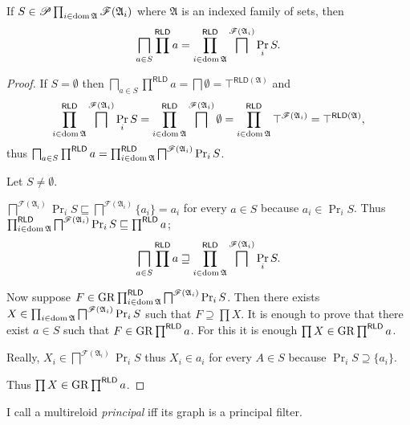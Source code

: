 \begin{thm}
If $S\in\mathscr{P}\prod_{i\in\operatorname{dom}\mathfrak{A}}\mathscr{F}(\mathfrak{A}_{i})$
where $\mathfrak{A}$ is an indexed family of sets, then 
\[
\bigsqcap_{a\in S}\prod^{\mathsf{RLD}}a=\prod_{i\in\operatorname{dom}\mathfrak{A}}^{\mathsf{RLD}}\bigsqcap^{\mathscr{F}(\mathfrak{A}_{i})}\Pr_{i}S.
\]
\end{thm}
\begin{proof}
If $S=\emptyset$ then $\bigsqcap_{a\in S}\prod^{\mathsf{RLD}}a=\bigsqcap\emptyset=\top^{\mathsf{RLD}(\mathfrak{A})}$
and 
\[
\prod_{i\in\operatorname{dom}\mathfrak{A}}^{\mathsf{RLD}}\bigsqcap^{\mathscr{F}(\mathfrak{A}_{i})}\Pr_{i}S=
\prod_{i\in\operatorname{dom}\mathfrak{A}}^{\mathsf{RLD}}\bigsqcap^{\mathscr{F}(\mathfrak{A}_{i})}\emptyset=\prod_{i\in\operatorname{dom}\mathfrak{A}}^{\mathsf{RLD}}\top^{\mathscr{F}(\mathfrak{A}_{i})}=\top^{\mathsf{RLD}(\mathfrak{A})},
\]
thus $\bigsqcap_{a\in S}\prod^{\mathsf{RLD}}a=\prod_{i\in\operatorname{dom}\mathfrak{A}}^{\mathsf{RLD}}\bigsqcap^{\mathscr{F}(\mathfrak{A}_{i})}\Pr_{i}S$.

Let $S\ne\emptyset$.

$\bigsqcap^{\mathscr{F}(\mathfrak{A}_{i})}\Pr_{i}S\sqsubseteq\bigsqcap^{\mathscr{F}(\mathfrak{A}_{i})}\{a_{i}\}=a_{i}$
for every $a\in S$ because $a_{i}\in\Pr_{i}S$. Thus $\prod_{i\in\operatorname{dom}\mathfrak{A}}^{\mathsf{RLD}}\bigsqcap^{\mathscr{F}(\mathfrak{A}_{i})}\Pr_{i}S\sqsubseteq\prod^{\mathsf{RLD}}a$;
\[
\bigsqcap_{a\in S}\prod^{\mathsf{RLD}}a\sqsupseteq\prod_{i\in\operatorname{dom}\mathfrak{A}}^{\mathsf{RLD}}\bigsqcap^{\mathscr{F}(\mathfrak{A}_{i})}\Pr_{i}S.
\]


Now suppose $F\in\operatorname{GR}\prod_{i\in\operatorname{dom}\mathfrak{A}}^{\mathsf{RLD}}\bigsqcap^{\mathscr{F}(\mathfrak{A}_{i})}\Pr_{i}S$.
Then there exists $X\in\prod_{i\in\operatorname{dom}\mathfrak{A}}\bigsqcap^{\mathscr{F}(\mathfrak{A}_{i})}\Pr_{i}S$
such that $F\supseteq\prod X$. It is enough to prove that there exist
$a\in S$ such that $F\in\operatorname{GR}\prod^{\mathsf{RLD}}a$. For this it is
enough $\prod X\in\operatorname{GR}\prod^{\mathsf{RLD}}a$.

Really, $X_{i}\in\bigsqcap^{\mathscr{F}(\mathfrak{A}_{i})}\Pr_{i}S$
thus $X_{i}\in a_{i}$ for every $A\in S$ because $\Pr_{i}S\supseteq\{a_{i}\}$.

Thus $\prod X\in\operatorname{GR}\prod^{\mathsf{RLD}}a$.\end{proof}
\begin{defn}
I call a multireloid \emph{principal}
iff its graph is a principal filter.
\end{defn}

